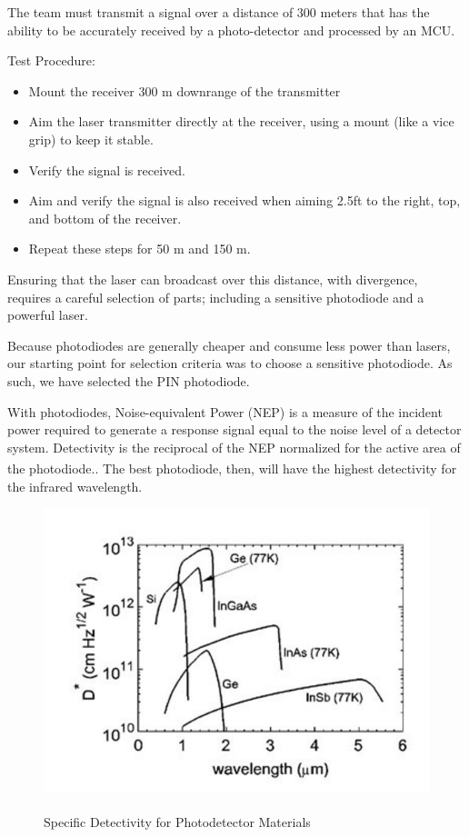 \documentclass[openbib,letterpaper,10pt]{article}
\begin{document}
\begin{spacing}{1.15}
The team must transmit a signal over a distance of 300 meters that has the ability to be accurately received by a photo-detector and processed by an MCU. 

Test Procedure:
 
\begin{itemize}
	\item Mount the receiver 300 m downrange of the transmitter
	\item Aim the laser transmitter directly at the receiver, using a mount (like a vice grip) to keep it stable. 
	\item Verify the signal is received.
	\item Aim and verify the signal is also received when aiming 2.5ft to the right, top, and bottom of the receiver. 
	\item Repeat these steps for 50 m and 150 m. 
\end{itemize}

Ensuring that the laser can broadcast over this distance, with divergence, requires a careful selection of parts; including a sensitive photodiode and a powerful laser. 

Because photodiodes are generally cheaper and consume less power than lasers, our starting point for selection criteria was to choose a sensitive photodiode. As such, we have selected the PIN photodiode. 

With photodiodes, Noise-equivalent Power (NEP) is a measure of the incident power required to generate a response signal equal to the noise level of a detector system. Detectivity is the reciprocal of the NEP normalized for the active area of the photodiode.\textsuperscript{\cite{Microphotonics}}. The best photodiode, then, will have the highest detectivity for the infrared wavelength.  

\begin{figure} [H]
	\centering
	\includegraphics[scale=0.4]{detectivity-table.png}
	\label{fig:detectivity-table}
	\caption{Specific Detectivity for Photodetector Materials \textsuperscript{\cite{Optical}} \label{fig:detectivity-table}}
\end{figure}


\end{spacing}
\end{document}

